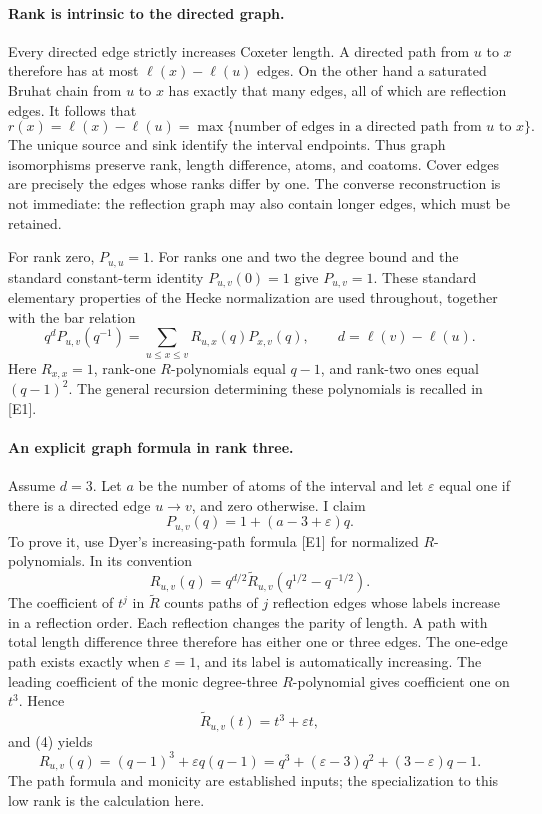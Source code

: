 \documentclass[11pt]{article}
\begin{document}
\paragraph{Rank is intrinsic to the directed graph.}
Every directed edge strictly increases Coxeter length. A directed path
from $u$ to $x$ therefore has at most $\ell(x)-\ell(u)$ edges.
On the other hand a saturated Bruhat chain from $u$ to $x$ has exactly
that many edges, all of which are reflection edges. It follows that
\[
 r(x)=\ell(x)-\ell(u)
 =\max\{\text{number of edges in a directed path from }u\text{ to }x\}.
                                                        \tag{1}
\]
The unique source and sink identify the interval endpoints. Thus graph
isomorphisms preserve rank, length difference, atoms, and coatoms.
Cover edges are precisely the edges whose ranks differ by one.
The converse reconstruction is not immediate: the reflection graph
may also contain longer edges, which must be retained.

For rank zero, $P_{u,u}=1$. For ranks one and two the degree bound and
the standard constant-term identity $P_{u,v}(0)=1$ give $P_{u,v}=1$.
These standard elementary properties of the Hecke normalization are
used throughout, together with the bar relation
\[
 q^dP_{u,v}(q^{-1})=
 \sum_{u\le x\le v} R_{u,x}(q)P_{x,v}(q),
 \qquad d=\ell(v)-\ell(u).                           \tag{2}
\]
Here $R_{x,x}=1$, rank-one $R$-polynomials equal $q-1$, and
rank-two ones equal $(q-1)^2$. The general recursion determining these
polynomials is recalled in [E1].

\paragraph{An explicit graph formula in rank three.}
Assume $d=3$. Let $a$ be the number of atoms of the interval and let
$\varepsilon$ equal one if there is a directed edge $u\to v$, and
zero otherwise. I claim
\[
 P_{u,v}(q)=1+(a-3+\varepsilon)q.                     \tag{3}
\]
To prove it, use Dyer's increasing-path formula [E1] for normalized
$R$-polynomials. In its convention
\[
 R_{u,v}(q)=q^{d/2}\widetilde R_{u,v}
                         (q^{1/2}-q^{-1/2}).          \tag{4}
\]
The coefficient of $t^j$ in $\widetilde R$ counts paths of $j$
reflection edges whose labels increase in a reflection order. Each
reflection changes the parity of length. A path with total length
difference three therefore has either one or three edges. The one-edge
path exists exactly when $\varepsilon=1$, and its label is automatically
increasing. The leading coefficient of the monic degree-three
$R$-polynomial gives coefficient one on $t^3$. Hence
\[
 \widetilde R_{u,v}(t)=t^3+\varepsilon t,
\]
and (4) yields
\[
 R_{u,v}(q)=(q-1)^3+\varepsilon q(q-1)
 =q^3+(\varepsilon-3)q^2+(3-\varepsilon)q-1.          \tag{5}
\]
The path formula and monicity are established inputs; the specialization
to this low rank is the calculation here.
\end{document}
